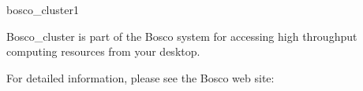 \begin{ManPage}{\label{man-bosco-cluster}bosco\_cluster}{1}
{Bosco\_cluster is part of the Bosco system for accessing high
throughput computing resources from your desktop.

For detailed information, please see the Bosco web site:
}


\end{ManPage}
